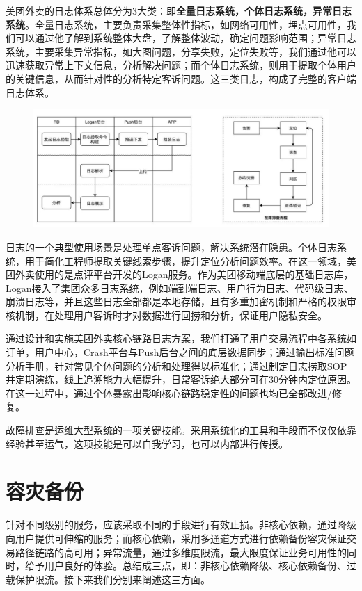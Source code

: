 \documentclass[12pt]{article}
\begin{document}
美团外卖的日志体系总体分为3大类：即\textbf{全量日志系统，个体日志系统，异常日志系统}。全量日志系统，主要负责采集整体性指标，如网络可用性，埋点可用性，我们可以通过他了解到系统整体大盘，了解整体波动，确定问题影响范围；异常日志系统，主要采集异常指标，如大图问题，分享失败，定位失败等，我们通过他可以迅速获取异常上下文信息，分析解决问题；而个体日志系统，则用于提取个体用户的关键信息，从而针对性的分析特定客诉问题。这三类日志，构成了完整的客户端日志体系。

\begin{figure}[H]
    \centering
    \includegraphics[width=1\textwidth]{fig/Meituan_APP_High_6.png}
\end{figure}

日志的一个典型使用场景是处理单点客诉问题，解决系统潜在隐患。个体日志系统，用于简化工程师提取关键线索步骤，提升定位分析问题效率。在这一领域，美团外卖使用的是点评平台开发的Logan服务。作为美团移动端底层的基础日志库，Logan接入了集团众多日志系统，例如端到端日志、用户行为日志、代码级日志、崩溃日志等，并且这些日志全部都是本地存储，且有多重加密机制和严格的权限审核机制，在处理用户客诉时才对数据进行回捞和分析，保证用户隐私安全。

通过设计和实施美团外卖核心链路日志方案，我们打通了用户交易流程中各系统如订单，用户中心，Crash平台与Push后台之间的底层数据同步；通过输出标准问题分析手册，针对常见个体问题的分析和处理得以标准化；通过制定日志捞取SOP并定期演练，线上追溯能力大幅提升，日常客诉绝大部分可在30分钟内定位原因。在这一过程中，通过个体暴露出影响核心链路稳定性的问题也均已全部改进/修复。

故障排查是运维大型系统的一项关键技能。采用系统化的工具和手段而不仅仅依靠经验甚至运气，这项技能是可以自我学习，也可以内部进行传授。

\section{容灾备份}
针对不同级别的服务，应该采取不同的手段进行有效止损。非核心依赖，通过降级向用户提供可伸缩的服务；而核心依赖，采用多通道方式进行依赖备份容灾保证交易路径链路的高可用；异常流量，通过多维度限流，最大限度保证业务可用性的同时，给予用户良好的体验。总结成三点，即：非核心依赖降级、核心依赖备份、过载保护限流。接下来我们分别来阐述这三方面。
\end{document}
